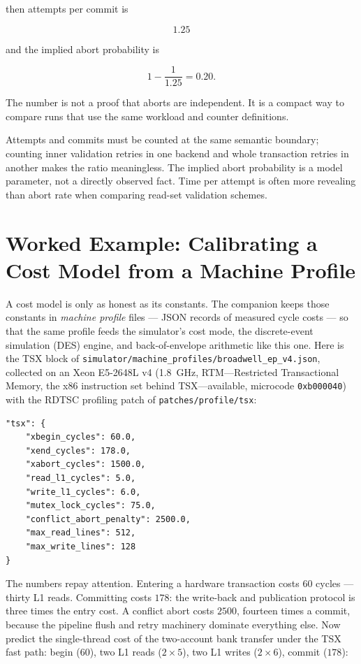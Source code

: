 then attempts per commit is

$$
1.25
$$

and the implied abort probability is

$$
1 - \frac{1}{1.25} = 0.20.
$$

The number is not a proof that aborts are independent. It is a compact way to compare runs that use the same workload and counter definitions.

Attempts and commits must be counted at the same semantic boundary; counting inner validation retries in one backend and whole transaction retries in another makes the ratio meaningless. The implied abort probability is a model parameter, not a directly observed fact. Time per attempt is often more revealing than abort rate when comparing read-set validation schemes.

\section{Worked Example: Calibrating a Cost Model from a Machine Profile}
\label{sec:perf-calibration}

A cost model is only as honest as its constants. The companion keeps those
constants in \emph{machine profile} files --- JSON records of measured cycle
costs --- so that the same profile feeds the simulator's cost mode, the
discrete-event simulation (DES) engine, and back-of-envelope arithmetic like
this one. Here is the TSX block of
\texttt{simulator/machine\_profiles/broadwell\_ep\_v4.json}, collected on
an Xeon E5-2648L v4 (1.8~GHz, RTM---Restricted Transactional Memory, the
x86 instruction set behind TSX---available, microcode \texttt{0xb000040})
with the RDTSC profiling patch of \texttt{patches/profile/tsx}:

\begin{lstlisting}[caption={The measured TSX block of the Broadwell-EP machine profile.}]
"tsx": {
    "xbegin_cycles": 60.0,
    "xend_cycles": 178.0,
    "xabort_cycles": 1500.0,
    "read_l1_cycles": 5.0,
    "write_l1_cycles": 6.0,
    "mutex_lock_cycles": 75.0,
    "conflict_abort_penalty": 2500.0,
    "max_read_lines": 512,
    "max_write_lines": 128
}
\end{lstlisting}

The numbers repay attention. Entering a hardware transaction costs
$60$ cycles --- thirty L1 reads. Committing costs $178$: the write-back and
publication protocol is three times the entry cost. A conflict abort costs
$2500$, fourteen times a commit, because the pipeline flush and retry machinery
dominate everything else. Now predict the single-thread cost of the two-account
bank transfer under the TSX fast path: begin ($60$), two L1 reads ($2\times5$),
two L1 writes ($2\times6$), commit ($178$):

